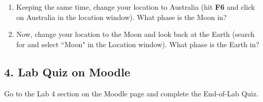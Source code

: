 \documentclass[main.tex]{subfiles}
\begin{document}
\begin{enumerate}
\item Keeping the same time, change your location to Australia (hit \textbf{F6} and click on Australia in the location window). What phase is the Moon in?

\item Now, change your location to the Moon and look back at the Earth (search for and select ``Moon" in the Location window). What phase is the Earth in?

\end{enumerate}

\subsection*{4. Lab Quiz on Moodle}
Go to the Lab 4 section on the Moodle page and complete the End-of-Lab Quiz.


\end{document}
